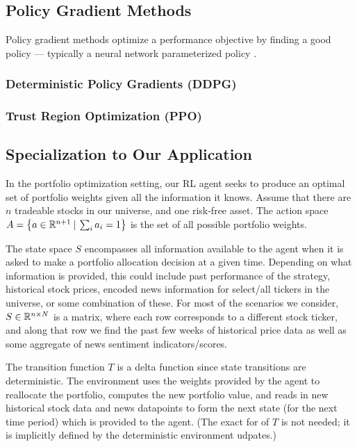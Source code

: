 \subsection{Policy Gradient Methods}

Policy gradient methods optimize a performance objective by finding a good policy
--- typically a neural network parameterized policy \cite{introtodeeprl}.

\subsubsection{Deterministic Policy Gradients (DDPG)}

\subsubsection{Trust Region Optimization (PPO)}

\subsection{Specialization to Our Application}

In the portfolio optimization setting, our RL agent seeks to produce an optimal set of portfolio weights given all the information it knows.
Assume that there are $n$ tradeable stocks in our universe, and one risk-free asset.
The action space $A = \left\{a \in \mathbb{R}^{n+1} \:|\: \sum_i a_i = 1\right\}$ is the set of all possible portfolio weights.

The state space $S$ encompasses all information available to the agent when it is asked to make a portfolio allocation decision at a given time.
Depending on what information is provided, this could include past performance of the strategy, historical stock prices, encoded news information for
select/all tickers in the universe, or some combination of these. For most of the scenarios we consider, $S \in \mathbb{R}^{n \times N}$ is a matrix, where
each row corresponds to a different stock ticker, and along that row we find the past few weeks of historical price data as well as some
aggregate of news sentiment indicators/scores.

The transition function $T$ is a delta function since state transitions are deterministic.
The environment uses the weights provided by the agent to reallocate the portfolio, computes the new portfolio value,
and reads in new historical stock data and news datapoints to form the next state (for the next time period) which is provided to the agent.
(The exact for of $T$ is not needed; it is implicitly defined by the deterministic environment udpates.)

